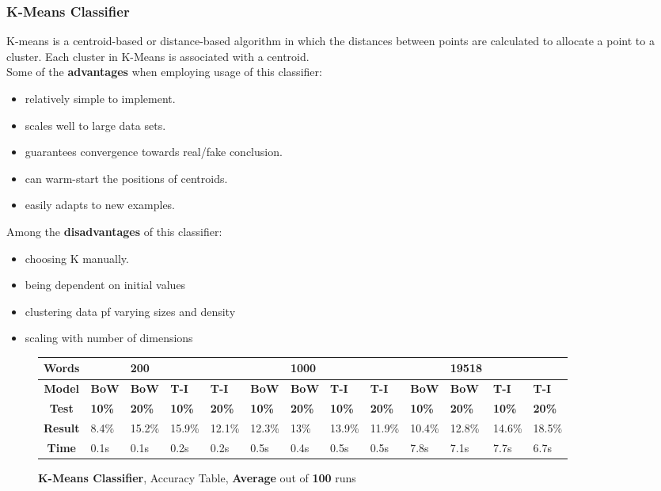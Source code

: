 \documentclass{article}
\begin{document}
	\subsubsection{K-Means Classifier}
K-means is a centroid-based or distance-based algorithm in which the distances between points are calculated to allocate a point to a cluster.
Each cluster in K-Means is associated with a centroid. \\
Some of the \textbf{advantages} when employing usage of this classifier:
\begin{itemize}
\item relatively simple to implement.
\item scales well to large data sets.
\item guarantees convergence towards real/fake conclusion.
\item can warm-start the positions of centroids.
\item easily adapts to new examples.
\end{itemize}

Among the \textbf{disadvantages} of this classifier:
\begin{itemize}
\item choosing K manually.
\item being dependent on initial values
\item clustering data pf varying sizes and density
\item scaling with number of dimensions
\end{itemize}
	\begin{figure}[H]
		\begin{tabular}{||c||l|l|l|l||l|l|l|l||l|l|l|l||}
			\hline
			\textbf{Words} &  & \textbf{200} & & & &\textbf{1000} & & & & \textbf{19518} &  & \\ \hline 
			\textbf{Model} & \textbf{BoW} & \textbf{BoW} & \textbf{T-I} & \textbf{T-I} &\textbf{BoW} & \textbf{BoW} & \textbf{T-I} & \textbf{T-I} & \textbf{BoW} & \textbf{BoW} & \textbf{T-I} & \textbf{T-I}\\ \hline
			\textbf{Test} & \textbf{10\%} & \textbf{20\%} & \textbf{10\%} & \textbf{20\%} & \textbf{10\%} & \textbf{20\%} & \textbf{10\%} & \textbf{20\%} & \textbf{10\%} & \textbf{20\%} & \textbf{10\%} & \textbf{20\%} \\ \hline \hline  
			\textbf{Result} & 8.4\% & 15.2\% & 15.9\% & 12.1\% & 12.3\% & 13\% & 13.9\% & 11.9\% & 10.4\% & 12.8\% & 14.6\% & 18.5\% \\ \hline 
			\textbf{Time} &0.1s & 0.1s & 0.2s & 0.2s & 0.5s & 0.4s & 0.5s & 0.5s & 7.8s & 7.1s & 7.7s & 6.7s \\ \hline 
		\end{tabular}
		\caption{\textbf{K-Means Classifier}, Accuracy Table, \textbf{Average} out of \textbf{100} runs}
	\end{figure}
\end{document}

